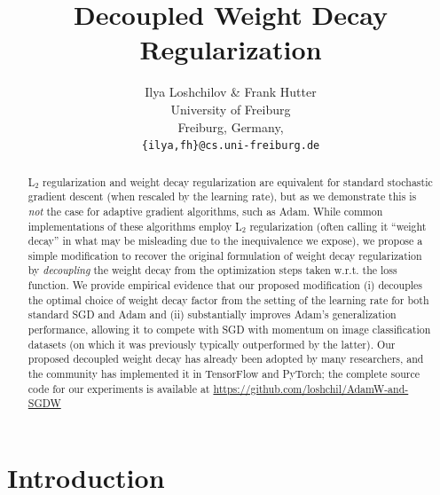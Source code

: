 \documentclass[usenames,dvipsnames]{article}
\title{Decoupled Weight Decay Regularization}
\author{Ilya Loshchilov \& Frank Hutter \\
University of Freiburg\\
Freiburg, Germany, \\
\texttt{\{ilya,fh\}@cs.uni-freiburg.de} 
}
\def\R{{\rm I\hspace{-0.50ex}R}}
\def\E{\mathds{E}}
\def\D{{\mathcal{D}}}
\def\H{\textbf{H}}
\def\A{\cal{A}}
\begin{document}
\maketitle

\begin{abstract} 
L$_2$ regularization and weight decay regularization are equivalent for standard stochastic gradient descent (when rescaled by the learning rate), but as we demonstrate this is \emph{not} the case for adaptive gradient algorithms, such as Adam.
While common implementations of these algorithms employ L$_2$ regularization (often calling it ``weight decay'' in what may be misleading due to the inequivalence we expose), we propose a simple modification to recover the original formulation of weight decay regularization by \emph{decoupling} the weight decay from the optimization steps taken w.r.t. the loss function.
We provide empirical evidence that our proposed modification (i) decouples the optimal choice of weight decay factor from the setting of the learning rate for both standard SGD and Adam and (ii) substantially improves Adam's generalization performance, allowing it to compete with SGD with momentum on image classification datasets (on which it was previously typically outperformed by the latter).
Our proposed decoupled weight decay has already been adopted by many researchers, and the community has implemented it in TensorFlow and PyTorch; the complete source code for our experiments is available at \url{https://github.com/loshchil/AdamW-and-SGDW}

\end{abstract}

\section{Introduction}

\def\R{{\rm I\hspace{-0.50ex}R}}
\def\E{\mathds{E}}
\def\D{{\mathcal{D}}}
\def\H{\textbf{H}}
\def\A{\cal{A}}

\newcommand{\ma}[1]{\mathchoice{\mbox{\boldmath$\displaystyle#1$}}
  {\mbox{\boldmath$\textstyle#1$}} {\mbox{\boldmath$\scriptstyle#1$}}
  {\mbox{\boldmath$\scriptscriptstyle#1$}}}
\renewcommand{\ma}[1]{\mathnormal{\mathbf{#1}}}
\newcommand{\mstr}[1]{\mathrm{#1}}
\newcommand{\C}{ \ensuremath{\ma{C}} }
\newcommand{\I}{ \ensuremath{\ma{I}} }
\newcommand{\M}{ \ensuremath{\ma{M}} }
\newcommand{\NormalNullC}{{\mathcal N}  \hspace{-0.13em}\left({\ma{0},\C\,}\right)}
\newcommand{\dd}{n}
\end{document}

